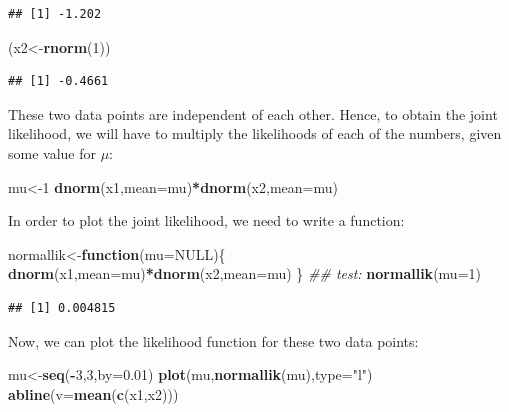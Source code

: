 \documentclass[12pt,]{krantz}
\newenvironment{Shaded}{\begin{snugshade}}{\end{snugshade}}
\newcommand{\CommentTok}[1]{\textcolor[rgb]{0.56,0.35,0.01}{\textit{#1}}}
\newcommand{\ControlFlowTok}[1]{\textcolor[rgb]{0.13,0.29,0.53}{\textbf{#1}}}
\newcommand{\DataTypeTok}[1]{\textcolor[rgb]{0.13,0.29,0.53}{#1}}
\newcommand{\DecValTok}[1]{\textcolor[rgb]{0.00,0.00,0.81}{#1}}
\newcommand{\FloatTok}[1]{\textcolor[rgb]{0.00,0.00,0.81}{#1}}
\newcommand{\KeywordTok}[1]{\textcolor[rgb]{0.13,0.29,0.53}{\textbf{#1}}}
\newcommand{\NormalTok}[1]{#1}
\newcommand{\OperatorTok}[1]{\textcolor[rgb]{0.81,0.36,0.00}{\textbf{#1}}}
\newcommand{\OtherTok}[1]{\textcolor[rgb]{0.56,0.35,0.01}{#1}}
\newcommand{\StringTok}[1]{\textcolor[rgb]{0.31,0.60,0.02}{#1}}
\begin{document}
\begin{verbatim}
## [1] -1.202
\end{verbatim}

\begin{Shaded}
\begin{Highlighting}[]
\NormalTok{(x2<-}\KeywordTok{rnorm}\NormalTok{(}\DecValTok{1}\NormalTok{))}
\end{Highlighting}
\end{Shaded}

\begin{verbatim}
## [1] -0.4661
\end{verbatim}

These two data points are independent of each other. Hence, to obtain the joint likelihood, we will have to multiply the likelihoods of each of the numbers, given some value for \(\mu\):

\begin{Shaded}
\begin{Highlighting}[]
\NormalTok{mu<-}\DecValTok{1}
\KeywordTok{dnorm}\NormalTok{(x1,}\DataTypeTok{mean=}\NormalTok{mu)}\OperatorTok{*}\KeywordTok{dnorm}\NormalTok{(x2,}\DataTypeTok{mean=}\NormalTok{mu)}
\end{Highlighting}
\end{Shaded}

In order to plot the joint likelihood, we need to write a function:

\begin{Shaded}
\begin{Highlighting}[]
\NormalTok{normallik<-}\ControlFlowTok{function}\NormalTok{(}\DataTypeTok{mu=}\OtherTok{NULL}\NormalTok{)\{}
  \KeywordTok{dnorm}\NormalTok{(x1,}\DataTypeTok{mean=}\NormalTok{mu)}\OperatorTok{*}\KeywordTok{dnorm}\NormalTok{(x2,}\DataTypeTok{mean=}\NormalTok{mu)}
\NormalTok{\}}
\CommentTok{## test:}
\KeywordTok{normallik}\NormalTok{(}\DataTypeTok{mu=}\DecValTok{1}\NormalTok{)}
\end{Highlighting}
\end{Shaded}

\begin{verbatim}
## [1] 0.004815
\end{verbatim}

Now, we can plot the likelihood function for these two data points:

\begin{Shaded}
\begin{Highlighting}[]
\NormalTok{mu<-}\KeywordTok{seq}\NormalTok{(}\OperatorTok{-}\DecValTok{3}\NormalTok{,}\DecValTok{3}\NormalTok{,}\DataTypeTok{by=}\FloatTok{0.01}\NormalTok{)}
\KeywordTok{plot}\NormalTok{(mu,}\KeywordTok{normallik}\NormalTok{(mu),}\DataTypeTok{type=}\StringTok{"l"}\NormalTok{)}
\KeywordTok{abline}\NormalTok{(}\DataTypeTok{v=}\KeywordTok{mean}\NormalTok{(}\KeywordTok{c}\NormalTok{(x1,x2)))}
\end{Highlighting}
\end{Shaded}
\end{document}
